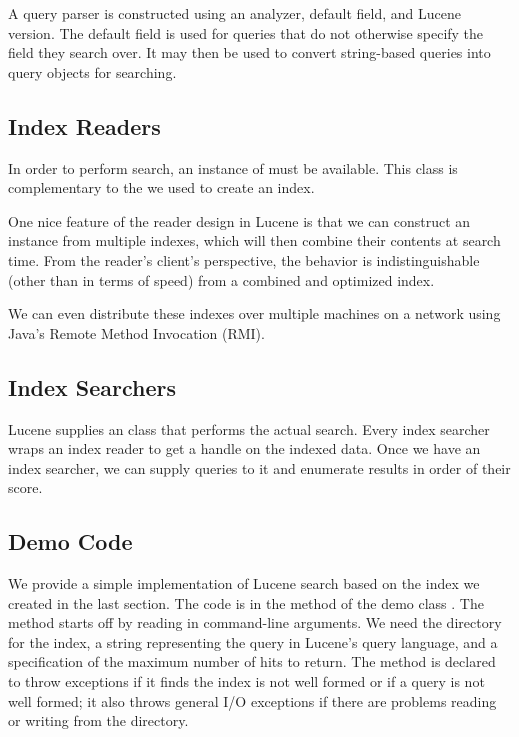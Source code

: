 A query parser is constructed using an analyzer, default field, and
Lucene version.  The default field is used for queries that do not
otherwise specify the field they search over.  It may then be used to
convert string-based queries into query objects for searching.

\subsection{Index Readers}

In order to perform search, an instance of  must be
available.  This class is complementary to the  we
used to create an index.  

One nice feature of the reader design in Lucene is that we can
construct an instance from multiple indexes, which will then combine
their contents at search time.  From the reader's client's
perspective, the behavior is indistinguishable (other than in terms of
speed) from a combined and optimized index.  

We can even distribute these indexes over multiple machines on a
network using Java's Remote Method Invocation (RMI).  


\subsection{Index Searchers}

Lucene supplies an  class that performs the actual
search.  Every index searcher wraps an index reader to get a handle
on the indexed data.  Once we have an index searcher, we can supply
queries to it and enumerate results in order of their score.

\subsection{Demo Code}

We provide a simple implementation of Lucene search based on the index
we created in the last section.  The code is in the 
method of the demo class .  The method starts off
by reading in command-line arguments.
%
%
We need the directory for the index, a string representing the query
in Lucene's query language, and a specification of the maximum number
of hits to return.  The method is declared to throw exceptions if it
finds the index is not well formed or if a query is not well formed;
it also throws general I/O exceptions if there are problems reading or
writing from the directory.

